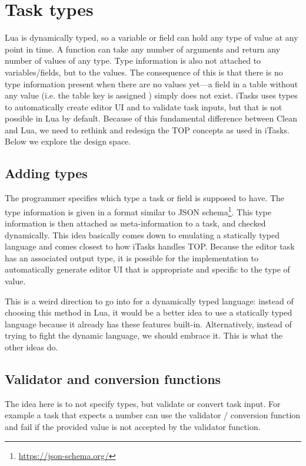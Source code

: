 \section{Task types}\label{section-types}

Lua is dynamically typed, so a variable or field can hold any type of value at any point in time. A function can take any number of arguments and return any number of values of any type. Type information is also not attached to variables/fields, but to the values. The consequence of this is that there is no type information present when there are no values yet---a field in a table without any value (i.e. the table key is assigned ) simply does not exist.
iTasks uses types to automatically create editor UI and to validate task inputs, but that is not possible in Lua by default. Because of this fundamental difference between Clean and Lua, we need to rethink and redesign the TOP concepts as used in iTasks. Below we explore the design space.

\subsection{Adding types}\label{section-types-adding}
The programmer specifies which type a task or field is supposed to have. The type information is given in a format similar to JSON schema\footnote{\label{footnote-json-schema}\url{https://json-schema.org/}}. This type information is then attached as meta-information to a task, and checked dynamically. This idea basically comes down to emulating a statically typed language and comes closest to how iTasks handles TOP. Because the editor task has an associated output type, it is possible for the implementation to automatically generate editor UI that is appropriate and specific to the type of value.

This is a weird direction to go into for a dynamically typed language: instead of choosing this method in Lua, it would be a better idea to use a statically typed language because it already has these features built-in. Alternatively, instead of trying to fight the dynamic language, we should embrace it. This is what the other ideas do.

\subsection{Validator and conversion functions}\label{section-types-validator-conversion}
The idea here is to not specify types, but validate or convert task input. For example a task that expects a number can use the  validator / conversion function and fail if the provided value is not accepted by the validator function.

